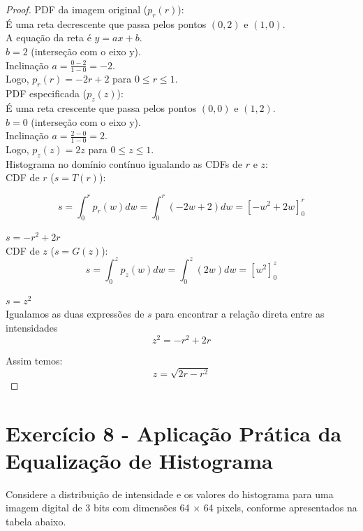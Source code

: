 \documentclass[a4paper,12pt]{article}
\begin{document}
\begin{proof}

PDF da imagem original ($p_r(r)$): \\
É uma reta decrescente que passa pelos pontos $(0, 2)$ e $(1, 0)$.\\
A equação da reta é $y = ax + b$.\\
$b = 2$ (interseção com o eixo y).\\
Inclinação $a = \frac{0 - 2}{1 - 0} = -2$.\\
Logo, $p_r(r) = -2r + 2$ para $0 \leq r \leq 1$.\\

PDF especificada ($p_z(z)$): \\
É uma reta crescente que passa pelos pontos $(0, 0)$ e $(1, 2)$.\\
$b = 0$ (interseção com o eixo y).\\
Inclinação $a = \frac{2 - 0}{1 - 0} = 2$.\\
Logo, $p_z(z) = 2z$ para $0 \leq z \leq 1$.\\

Histograma no domínio contínuo igualando as CDFs de $r$ e $z$:\\
CDF de $r$ ($s = T(r)$):

$$s = \int_{0}^{r} p_r(w) dw = \int_{0}^{r} (-2w + 2) dw = \left[ -w^2 + 2w \right]_0^r$$

$s = -r^2 + 2r$\\

CDF de $z$ ($s = G(z)$):\\

$$s = \int_{0}^{z} p_z(w) dw = \int_{0}^{z} (2w) dw = \left[ w^2 \right]_0^z$$

$s = z^2$\\

Igualamos as duas expressões de $s$ para encontrar a relação direta entre as intensidades\\
$$z^2 = -r^2 + 2r$$

Assim temos: \\

$$z = \sqrt{2r - r^2}$$

\end{proof}

\newpage
\section*{Exercício 8 - Aplicação Prática da Equalização de Histograma}

Considere a distribuição de intensidade e os valores do histograma para uma imagem digital de 3 bits
com dimensões 64 × 64 pixels, conforme apresentados na tabela abaixo.
\end{document}
